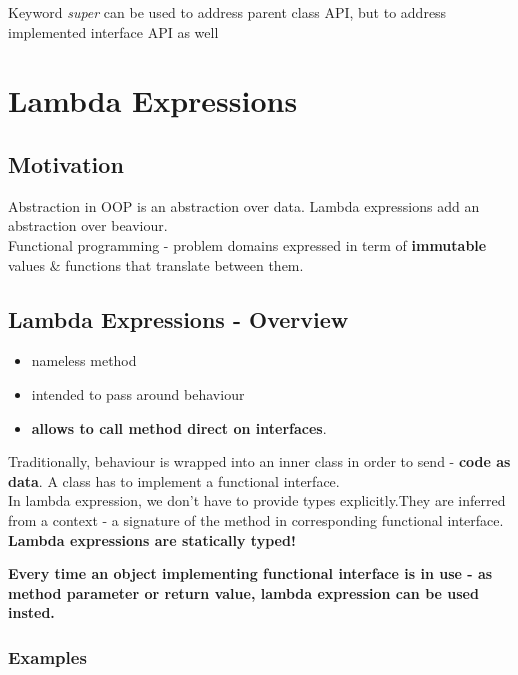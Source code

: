 \documentclass{report}
\begin{document}
Keyword \textit{super} can be used to address parent class API, but to address implemented interface API as well

\chapter{Lambda Expressions}
\section{Motivation}
Abstraction in OOP is an abstraction over data. Lambda expressions add an abstraction over beaviour.\\
Functional programming - problem domains expressed in term of \textbf{immutable} values \& functions that translate between them. 

\section{Lambda Expressions - Overview}
\begin{itemize}
	\item nameless method
	\item intended to pass around behaviour
	\item \textbf{allows to call method direct on interfaces}.
\end{itemize}
Traditionally, behaviour is wrapped into an inner class in order to send - \textbf{code as data}. A class has to implement a functional interface.\\
In lambda expression, we don't have to provide types explicitly.They are inferred from a context - a signature of the method in corresponding functional interface.\\
\textbf{Lambda expressions are statically typed!}
\par \textbf{Every time an object implementing functional interface is in use - as method parameter or return value, lambda expression can be used insted.}

\subsection*{Examples}
\end{document}
